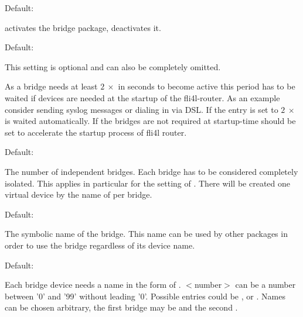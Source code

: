 \begin{description}


  Default: 

   activates the bridge package,  deactivates it.


  Default: 

  This setting is optional and can also be completely omitted.

  As a bridge needs at least $2\ \times$  in
  seconds to become active this period has to be waited if devices are needed 
  at the startup of the fli4l-router. As an example consider sending syslog messages 
  or dialing in via DSL. 
  If the entry is set to  $2\ \times$  
  is waited automatically. If the bridges are not required at startup-time
   should be set to accelerate the startup process of fli4l router.
  


  Default: 

  The number of independent bridges. Each bridge has to be considered 
  completely isolated. This applies in particular for the setting of 
  . There will be created one virtual device 
  by the name of  per bridge.
  

  Default: 

  The symbolic name of the bridge. This name can be used by other packages 
  in order to use the bridge regardless of its device name.
  

  Default: 

  Each bridge device needs a name in the form of
  . $<$number$>$ can be a number between '0' and
  '99' without leading '0'. Possible entries could be  
  ,  or . Names can be chosen 
  arbitrary, the first bridge may be  and the second .


\end{description}
